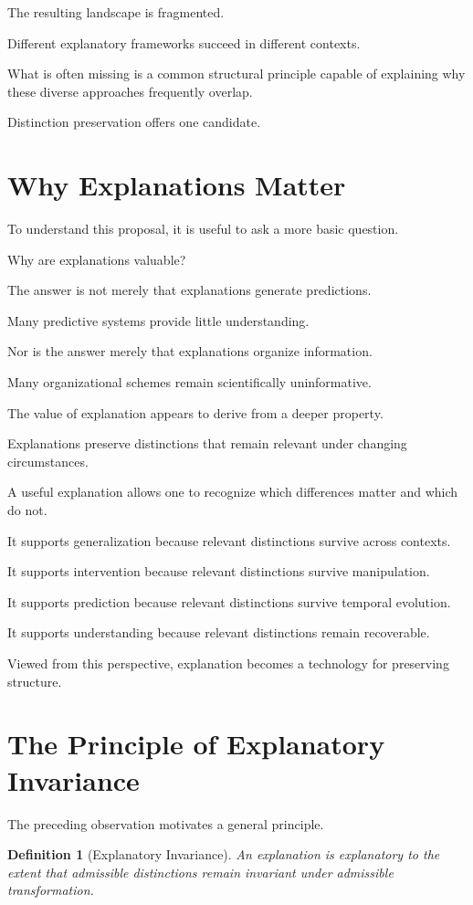 \documentclass[11pt,oneside,openany]{book}
\newtheorem{definition}{Definition}[chapter] \newtheorem{theorem}{Theorem}[chapter] \newtheorem{proposition}{Proposition}[chapter] \newtheorem{lemma}{Lemma}[chapter] \newtheorem{corollary}{Corollary}[chapter] \newtheorem{remark}{Remark}[chapter]
\begin{document}
The resulting landscape is fragmented.

Different explanatory frameworks succeed in different contexts.

What is often missing is a common structural principle capable of explaining why these diverse approaches frequently overlap.

Distinction preservation offers one candidate.

\section{Why Explanations Matter}

To understand this proposal, it is useful to ask a more basic question.

Why are explanations valuable?

The answer is not merely that explanations generate predictions.

Many predictive systems provide little understanding.

Nor is the answer merely that explanations organize information.

Many organizational schemes remain scientifically uninformative.

The value of explanation appears to derive from a deeper property.

Explanations preserve distinctions that remain relevant under changing circumstances.

A useful explanation allows one to recognize which differences matter and which do not.

It supports generalization because relevant distinctions survive across contexts.

It supports intervention because relevant distinctions survive manipulation.

It supports prediction because relevant distinctions survive temporal evolution.

It supports understanding because relevant distinctions remain recoverable.

Viewed from this perspective, explanation becomes a technology for preserving structure.

\section{The Principle of Explanatory Invariance}

The preceding observation motivates a general principle.

\begin{definition}[Explanatory Invariance]

An explanation is explanatory to the extent that admissible distinctions remain invariant under admissible transformation.

\end{definition}
\end{document}
